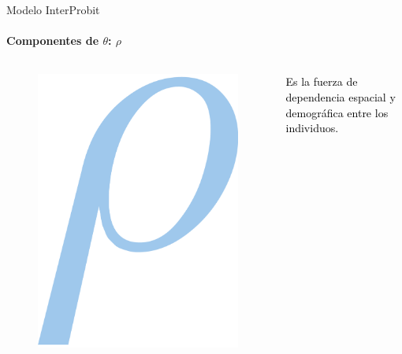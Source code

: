 \setwatermark{\fontsize{90pt}{90pt}\selectfont{\textcolor{frenchblue}{Probit}}}
\begin{frame}[t]{Modelo InterProbit}
\framesubtitle{Componentes de $\theta$: $\rho$}

\begin{columns}

\vspace*{.5 cm}
\begin{figure}[h]
\includegraphics[scale = .25]{./img/rho.png}
\end{figure}


\vspace*{.5 cm}
\textcolor{black}{
Es la fuerza de dependencia espacial y demográfica entre los individuos.}\\
\end{columns}
\vspace*{.4 cm}


\end{frame}
